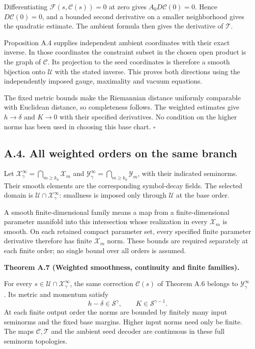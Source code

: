 \documentclass[
  english,
  11pt,
  reqno]{amsart}
\makeatletter
\newcommand{\pandocstatementheading}[1]{%
  \par\if@nobreak\else
    \addpenalty{\@beginparpenalty}%
    \addvspace{.5\baselineskip plus .2\baselineskip minus .2\baselineskip}%
  \fi
  {\normalfont\bfseries #1\par}%
  \nobreak\@afterindenttrue\@afterheading
}
\makeatother
\begin{document}
Differentiating \(\mathcal F(s,\mathcal C(s))=0\) at zero gives
\(A_0D\mathcal C(0)=0\). Hence \(D\mathcal C(0)=0\), and a bounded
second derivative on a smaller neighborhood gives the quadratic
estimate. The ambient formula then gives the derivative of
\(\mathcal T\).

Proposition A.4 supplies independent ambient coordinates with their
exact inverse. In those coordinates the constraint subset in the chosen
open product is the graph of \(\mathcal C\). Its projection to the seed
coordinates is therefore a smooth bijection onto \(\mathcal U\) with the
stated inverse. This proves both directions using the independently
imposed gauge, maximality and vacuum equations.

The fixed metric bounds make the Riemannian distance uniformly
comparable with Euclidean distance, so completeness follows. The
weighted estimates give \(h\to\delta\) and \(K\to0\) with their
specified derivatives. No condition on the higher norms has been used in
choosing this base chart. \hfill\(\square\)

\subsection{A.4. All weighted orders on the same
branch}\label{a.4.-all-weighted-orders-on-the-same-branch}\label{sec:online-chart-same-branch-smoothness}

Let \(\mathcal X^\infty_\gamma=\bigcap_{m\ge k_0}\mathcal X_m\) and
\(\mathcal Y^\infty_\gamma=\bigcap_{m\ge k_0}\mathcal Y_m\), with their
indicated seminorms. Their smooth elements are the corresponding
symbol-decay fields. The selected domain is
\(\mathcal U\cap\mathcal X^\infty_\gamma\): smallness is imposed only
through \(\mathcal U\) at the base order.
\par{}

A smooth finite-dimensional family means a map from a finite-dimensional
parameter manifold into this intersection whose realization in every
\(\mathcal X_m\) is smooth. On each retained compact parameter set,
every specified finite parameter derivative therefore has finite
\(\mathcal X_m\) norm. These bounds are required separately at each
finite order; no single bound over all orders is assumed.

\pandocstatementheading{\leavevmode{}\label{thm:online-chart-one-branch-weighted-smoothness}Theorem A.7 (Weighted smoothness, continuity and finite families).}

For every \(s\in\mathcal U\cap\mathcal X^\infty_\gamma\), the same
correction \(\mathcal C(s)\) of Theorem A.6 belongs to
\(\mathcal Y^\infty_\gamma\). Its metric and momentum satisfy \[
h-\delta\in\mathscr S^\gamma,\qquad
K\in\mathscr S^{\gamma-1}.
\] At each finite output order the norms are bounded by finitely many
input seminorms and the fixed base margins. Higher input norms need only
be finite. The maps \(\mathcal C,\mathcal T\) and the ambient seed
decoder are continuous in these full seminorm topologies.
\end{document}
